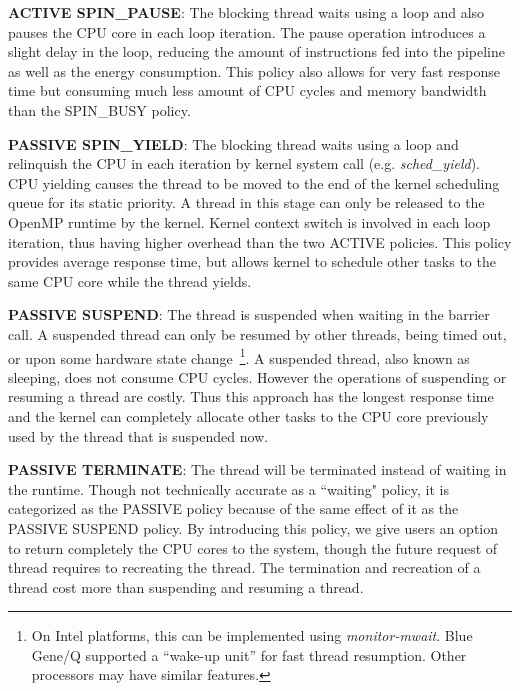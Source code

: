 	{\bf ACTIVE SPIN\_PAUSE}: The blocking thread waits using a loop and also pauses the CPU core in 
	each loop iteration. The pause operation introduces a slight delay in the loop, reducing the amount 
	of instructions fed into the pipeline as well as the energy consumption. This policy also allows 
	for very fast response time but consuming much less amount of CPU cycles 
	and memory bandwidth than the SPIN\_BUSY policy.

	{\bf PASSIVE SPIN\_YIELD}:  The blocking thread waits using a loop and 
	relinquish the CPU in each iteration by kernel system call (e.g. {\em sched\_yield}). CPU yielding causes
	the thread to be moved to the end of the kernel scheduling queue for its static priority. A thread in this 
		stage can only be released to the OpenMP runtime by the kernel. Kernel context switch is involved
		in each loop iteration, thus having higher overhead than the two ACTIVE policies. 
		This policy provides average response time, but allows kernel to schedule other tasks to the same
		CPU core while the thread yields. 

	{\bf PASSIVE SUSPEND}: The thread is suspended when waiting in the barrier call. A suspended thread can only
	be resumed by other threads, being timed out, or upon some hardware state change~\footnote{
                    On Intel platforms, this can be implemented using {\em monitor-mwait}.
                    Blue Gene/Q supported a ``wake-up unit'' for fast thread resumption.
                     Other processors may have similar features.}. A suspended thread, also known as sleeping,  
		     does not consume CPU cycles. 
		     However the operations of suspending or resuming a thread are costly. 
		     Thus this approach has the longest response time and 
		     the kernel can completely allocate other tasks to the CPU 
		     core previously used by the thread that is suspended now.

       {\bf PASSIVE TERMINATE}: The thread will be terminated instead of waiting in the runtime. Though not technically accurate as
       a ``waiting" policy, it is categorized as the PASSIVE policy because of the same effect of it as the {\sf PASSIVE SUSPEND} policy. 
       By introducing this policy, 
       we give users an option to return completely the CPU cores to the system, though the future request of thread requires to
       recreating the thread. The termination and recreation of a thread cost more than suspending and resuming a thread.  

